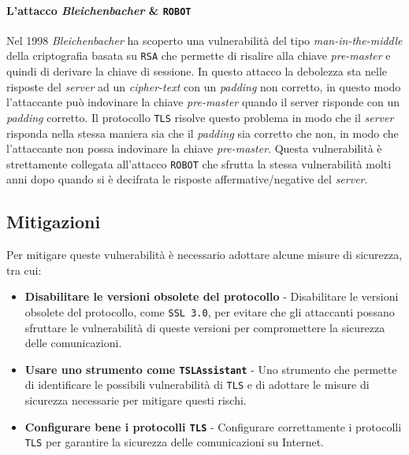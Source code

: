         \paragraph{L'attacco \textit{Bleichenbacher} \& \texttt{ROBOT}} Nel 1998 \textit{Bleichenbacher} ha scoperto una vulnerabilità del tipo \textit{man-in-the-middle} della criptografia basata su \texttt{RSA} che permette di risalire alla chiave \textit{pre-master} e quindi di derivare la chiave di sessione. In questo attacco la debolezza sta nelle risposte del \textit{server} ad un \textit{cipher-text} con un \textit{padding} non corretto, in questo modo l'attaccante può indovinare la chiave \textit{pre-master} quando il server risponde con un \textit{padding} corretto. Il protocollo \texttt{TLS} risolve questo problema in modo che il \textit{server} risponda nella stessa maniera sia che il \textit{padding} sia corretto che non, in modo che l'attaccante non possa indovinare la chiave \textit{pre-master}. Questa vulnerabilità è strettamente collegata all'attacco \texttt{ROBOT} che sfrutta la stessa vulnerabilità molti anni dopo quando si è decifrata le risposte affermative/negative del \textit{server}.
    \subsection{Mitigazioni}
        Per mitigare queste vulnerabilità è necessario adottare alcune misure di sicurezza, tra cui: \begin{itemize}
            \item \textbf{Disabilitare le versioni obsolete del protocollo} - Disabilitare le versioni obsolete del protocollo, come \texttt{SSL 3.0}, per evitare che gli attaccanti possano sfruttare le vulnerabilità di queste versioni per compromettere la sicurezza delle comunicazioni.
            \item \textbf{Usare uno strumento come \texttt{TSLAssistant}} - Uno strumento che permette di identificare le possibili vulnerabilità di \texttt{TLS} e di adottare le misure di sicurezza necessarie per mitigare questi rischi.
            \item \textbf{Configurare bene i protocolli \texttt{TLS}} - Configurare correttamente i protocolli \texttt{TLS} per garantire la sicurezza delle comunicazioni su Internet.
        \end{itemize}
